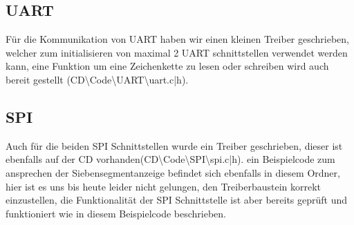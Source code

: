 \subsection{UART}
Für die Kommunikation von UART haben wir einen kleinen Treiber geschrieben, welcher zum initialisieren von maximal 2 UART schnittstellen verwendet werden kann, eine Funktion um eine Zeichenkette zu lesen oder schreiben wird auch bereit gestellt \tiny(CD\textbackslash Code\textbackslash UART\textbackslash uart.c|h)\normalsize.

\subsection{SPI}
Auch für die beiden SPI Schnittstellen wurde ein Treiber geschrieben, dieser ist ebenfalls auf der CD vorhanden\tiny(CD\textbackslash Code\textbackslash SPI\textbackslash spi.c|h)\normalsize.
ein Beispielcode zum ansprechen der Siebensegmentanzeige befindet sich ebenfalls in diesem Ordner, hier ist es uns bis heute leider nicht gelungen, den Treiberbaustein korrekt einzustellen, die Funktionalität der SPI Schnittstelle ist aber bereits geprüft und funktioniert wie in diesem Beispielcode beschrieben.
